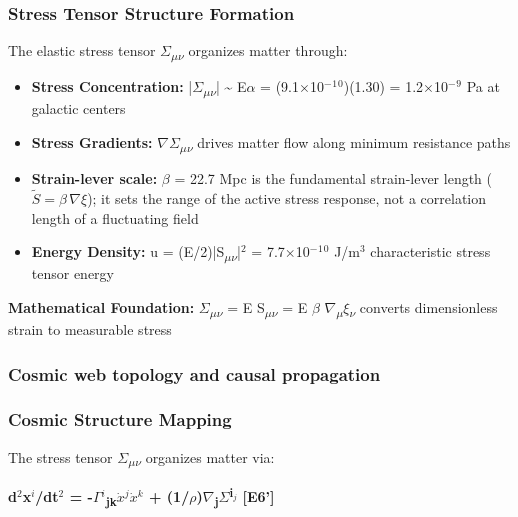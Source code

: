 \documentclass[11pt,a4paper]{article}
\begin{document}
\begin{mdframed}[linecolor=accent,linewidth=0.5pt,backgroundcolor=callout-bg,leftline=true,rightline=true,topline=true,bottomline=true,innerleftmargin=8pt,innerrightmargin=8pt,innertopmargin=6pt,innerbottommargin=6pt]
\subsubsection{Stress Tensor Structure Formation}
The elastic stress tensor $\Sigma$\textsubscript{$\mu$$\nu$} organizes matter through:

\begin{itemize}
  \item \textbf{Stress Concentration:} |$\Sigma$\textsubscript{$\mu$$\nu$}| \~{} E$\alpha$ = (9.1$\times$10$^{-}$$^{1}$$^{0}$)(1.30) = 1.2$\times$10$^{-}$$^{9}$ Pa at galactic centers
  \item \textbf{Stress Gradients:} $\nabla$$\Sigma$\textsubscript{$\mu$$\nu$} drives matter flow along minimum resistance paths
  \item \textbf{Strain-lever scale:} $\beta$ = 22.7 Mpc is the fundamental strain-lever length (\(\tilde{S} = \beta\,\nabla\xi\)); it sets the range of the active stress response, not a correlation length of a fluctuating field
  \item \textbf{Energy Density:} u = (E/\allowbreak{}2)|S\textsubscript{$\mu$$\nu$}|$^{2}$ = 7.7$\times$10$^{-}$$^{1}$$^{0}$ J/\allowbreak{}m$^{3}$ characteristic stress tensor energy
\end{itemize}

\textbf{Mathematical Foundation:} $\Sigma$\textsubscript{$\mu$$\nu$} = E S\textsubscript{$\mu$$\nu$} = E $\beta$ $\nabla$\textsubscript{$\mu$}$\xi$\textsubscript{$\nu$} converts dimensionless strain to measurable stress
\end{mdframed}

\subsubsection{Cosmic web topology and causal propagation}

\subsubsection{Cosmic Structure Mapping}
The stress tensor $\Sigma$\textsubscript{$\mu$$\nu$} organizes matter via:

\textbf{d$^{2}$x$^{i}$/dt$^{2}$ = -$\Gamma$$^{i}$\textsubscript{jk}$\dot{x}$$^{j}$$\dot{x}$$^{k}$ + (1/\allowbreak{}$\rho$)$\nabla$\textsubscript{j}$\Sigma$\textsuperscript{i$_{j}$} [E6']}
\end{document}
